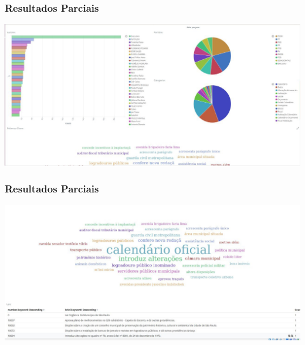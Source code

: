 \documentclass[11pt]{beamer}
\begin{document}
\begin{frame}
\frametitle{Resultados Parciais}
\includegraphics[width=\columnwidth,height=\textheight,keepaspectratio]{Cipoal3.jpg}

\end{frame}
\begin{frame}
\frametitle{Resultados Parciais}
\includegraphics[width=\columnwidth,height=\textheight,keepaspectratio]{Cipoal4.jpg}

\end{frame}
\end{document}
